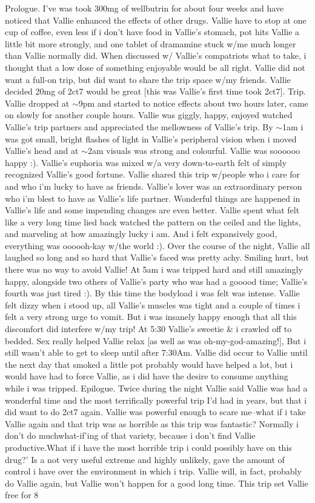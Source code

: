 \documentclass[12pt]{book}
\begin{document}
Prologue. I've was took 300mg of wellbutrin for about four weeks and have noticed that Vallie enhanced the effects of other drugs. Vallie have to stop at one cup of coffee, even less if i don't have food in Vallie's stomach, pot hits Vallie a little bit more strongly, and one tablet of dramamine stuck w/me much longer than Vallie normally did. When discussed w/ Vallie's compatriots what to take, i thought that a low dose of something enjoyable would be all right. Vallie did not want a full-on trip, but did want to share the trip space w/my friends. Vallie decided 20mg of 2ct7 would be great [this was Vallie's first time took 2ct7]. Trip. Vallie dropped at $\sim$9pm and started to notice effects about two hours later, came on slowly for another couple hours. Vallie was giggly, happy, enjoyed watched Vallie's trip partners and appreciated the mellowness of Vallie's trip. By $\sim$1am i was got small, bright flashes of light in Vallie's peripheral vision when i moved Vallie's head and at $\sim$2am visuals was strong and colourful. Vallie was soooooo happy :). Vallie's euphoria was mixed w/a very down-to-earth felt of simply recognized Vallie's good fortune. Vallie shared this trip w/people who i care for and who i'm lucky to have as friends. Vallie's lover was an extraordinary person who i'm blest to have as Vallie's life partner. Wonderful things are happened in Vallie's life and some impending changes are even better. Vallie spent what felt like a very long time lied back watched the pattern on the ceiled and the lights, and marveling at how amazingly lucky i am. And i felt expansively good, everything was oooooh-kay w/the world :). Over the course of the night, Vallie all laughed so long and so hard that Vallie's faced was pretty achy. Smiling hurt, but there was no way to avoid Vallie! At 5am i was tripped hard and still amazingly happy, alongside two others of Vallie's party who was had a gooood time; Vallie's fourth was just tired :). By this time the bodyload i was felt was intense. Vallie felt dizzy when i stood up, all Vallie's muscles was tight and a couple of times i felt a very strong urge to vomit. But i was insanely happy enough that all this discomfort did interfere w/my trip! At 5:30 Vallie's sweetie \& i crawled off to bedded. Sex really helped Vallie relax [as well as was oh-my-god-amazing!], But i still wasn't able to get to sleep until after 7:30Am. Vallie did occur to Vallie until the next day that smoked a little pot probably would have helped a lot, but i would have had to force Vallie, as i did have the desire to consume anything while i was tripped. Epilogue. Twice during the night Vallie said Vallie was had a wonderful time and the most terrifically powerful trip I'd had in years, but that i did want to do 2ct7 again. Vallie was powerful enough to scare me--what if i take Vallie again and that trip was as horrible as this trip was fantastic? Normally i don't do muchwhat-if'ing of that variety, because i don't find Vallie productive.What if i have the most horrible trip i could possibly have on this drug?' Is a not very useful extreme and highly unlikely, gave the amount of control i have over the environment in which i trip. Vallie will, in fact, probably do Vallie again, but Vallie won't happen for a good long time. This trip set Vallie free for 8 
\end{document}
